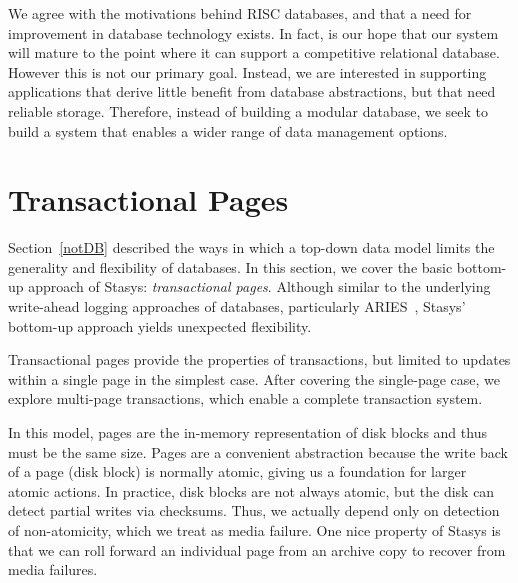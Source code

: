 \documentclass[letterpaper,twocolumn,10pt]{article}
\newcommand{\yad}{Stasys\xspace}
\newcommand{\yads}{Stasys'\xspace}
\begin{document}
We agree with the motivations behind RISC databases, and that a need
for improvement in database technology exists.  In fact, is our hope
that our system will mature to the point where it can support
a competitive relational database.  However this is
not our primary goal.  
Instead, we are interested in supporting applications that derive
little benefit from database abstractions, but that need reliable
storage.  Therefore, instead of building a modular database, we seek
to build a system that enables a wider range of data management options.





\section{Transactional Pages}

Section~\ref{notDB} described the ways in which a top-down data model
limits the generality and flexibility of databases.  In this section,
we cover the basic bottom-up approach of \yad: {\em transactional
pages}. Although similar to the underlying write-ahead logging
approaches of databases, particularly ARIES~\cite{aries}, \yads
bottom-up approach yields unexpected flexibility.

Transactional pages provide the properties of transactions, but
limited to updates within a single page in the simplest case.  After
covering the single-page case, we explore multi-page transactions,
which enable a complete transaction system.

In this model, pages are the in-memory representation of disk blocks
and thus must be the same size.  Pages are a convenient abstraction
because the write back of a page (disk block) is normally atomic,
giving us a foundation for larger atomic actions. In practice, disk
blocks are not always atomic, but the disk can detect partial writes
via checksums.  Thus, we actually depend only on detection of
non-atomicity, which we treat as media failure.  One nice property of
\yad is that we can roll forward an individual page from an archive copy to
recover from media failures.
\end{document}
